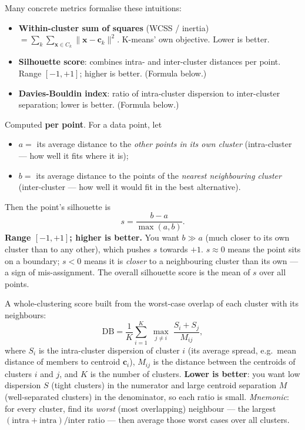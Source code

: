 \documentclass[11pt, a4paper]{article}
\begin{document}
Many concrete metrics formalise these intuitions:
\begin{itemize}
  \item \textbf{Within-cluster sum of squares} (WCSS / inertia) $= \sum_k \sum_{\mathbf{x}\in C_k} \|\mathbf{x} - \mathbf{c}_k\|^2$. K-means' own objective. Lower is better.
  \item \textbf{Silhouette score}: combines intra- and inter-cluster distances per point. Range $[-1, +1]$; higher is better. (Formula below.)
  \item \textbf{Davies-Bouldin index}: ratio of intra-cluster dispersion to inter-cluster separation; lower is better. (Formula below.)
\end{itemize}

\begin{defbox}
Computed \textbf{per point}. For a data point, let
\begin{itemize}
  \item $a = $ its average distance to the \emph{other points in its own cluster} (intra-cluster --- how well it fits where it is);
  \item $b = $ its average distance to the points of the \emph{nearest neighbouring cluster} (inter-cluster --- how well it would fit in the best alternative).
\end{itemize}
Then the point's silhouette is
\[
s = \frac{b - a}{\max(a, b)}.
\]
\textbf{Range $[-1, +1]$; higher is better.} You want $b \gg a$ (much closer to its own cluster than to any other), which pushes $s$ towards $+1$. $s \approx 0$ means the point sits on a boundary; $s < 0$ means it is \emph{closer} to a neighbouring cluster than its own --- a sign of mis-assignment. The overall silhouette score is the mean of $s$ over all points.
\end{defbox}

\begin{defbox}
A whole-clustering score built from the worst-case overlap of each cluster with its neighbours:
\[
\mathrm{DB} = \frac{1}{K}\sum_{i=1}^{K}\;\max_{j\neq i}\;\frac{S_i + S_j}{M_{ij}},
\]
where $S_i$ is the intra-cluster dispersion of cluster $i$ (its average spread, e.g.\ mean distance of members to centroid $\mathbf{c}_i$), $M_{ij}$ is the distance between the centroids of clusters $i$ and $j$, and $K$ is the number of clusters. \textbf{Lower is better}: you want low dispersion $S$ (tight clusters) in the numerator and large centroid separation $M$ (well-separated clusters) in the denominator, so each ratio is small. \emph{Mnemonic}: for every cluster, find its \emph{worst} (most overlapping) neighbour --- the largest $(\text{intra}+\text{intra})/\text{inter}$ ratio --- then average those worst cases over all clusters.
\end{defbox}
\end{document}
